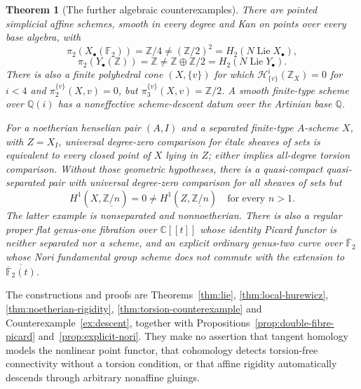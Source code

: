 \documentclass[11pt,a4paper]{article}
\newtheorem{theorem}{Theorem}[section]
\theoremstyle{definition}
\newcommand{\C}{\mathbb C}
\newcommand{\Z}{\mathbb Z}
\newcommand{\Q}{\mathbb Q}
\newcommand{\F}{\mathbb F}
\begin{document}
\begin{theorem}[The further algebraic counterexamples]\label{thm:algebraic-summary}
There are pointed simplicial affine schemes, smooth in every degree and Kan on points over every base algebra, with
\[
 \pi_2(X_\bullet(\F_2))=\Z/4\ne(\Z/2)^2=H_2(N\operatorname{Lie}X_\bullet),
\]
\[
 \pi_2(Y_\bullet(\Z))=\Z\ne\Z\oplus\Z/2=H_2(N\operatorname{Lie}Y_\bullet).
\]
There is also a finite polyhedral cone $(X,\{v\})$ for which $\mathcal H^i_{\{v\}}(\Z_X)=0$ for $i<4$ and $\pi_2^{\{v\}}(X,v)=0$, but $\pi_3^{\{v\}}(X,v)=\Z/2$. A smooth finite-type scheme over $\Q(i)$ has a noneffective scheme-descent datum over the Artinian base $\Q$.

For a noetherian henselian pair $(A,I)$ and a separated finite-type $A$-scheme $X$, with $Z=X_I$, universal degree-zero comparison for étale sheaves of sets is equivalent to every closed point of $X$ lying in $Z$; either implies all-degree torsion comparison. Without those geometric hypotheses, there is a quasi-compact quasi-separated pair with universal degree-zero comparison for all sheaves of sets but
\[
 H^1(X,\underline{\Z/n})=0\ne H^1(Z,\underline{\Z/n})
 \quad\text{for every }n>1.
\]
The latter example is nonseparated and nonnoetherian. There is also a regular proper flat genus-one fibration over $\C[[t]]$ whose identity Picard functor is neither separated nor a scheme, and an explicit ordinary genus-two curve over $\overline{\F}_2$ whose Nori fundamental group scheme does not commute with the extension to $\overline{\overline{\F}_2(t)}$.
\end{theorem}

The constructions and proofs are Theorems~\ref{thm:lie}, \ref{thm:local-hurewicz}, \ref{thm:noetherian-rigidity}, \ref{thm:torsion-counterexample} and Counterexample~\ref{ex:descent}, together with Propositions~\ref{prop:double-fibre-picard} and~\ref{prop:explicit-nori}. They make no assertion that tangent homology models the nonlinear point functor, that cohomology detects torsion-free connectivity without a torsion condition, or that affine rigidity automatically descends through arbitrary nonaffine gluings.
\end{document}
